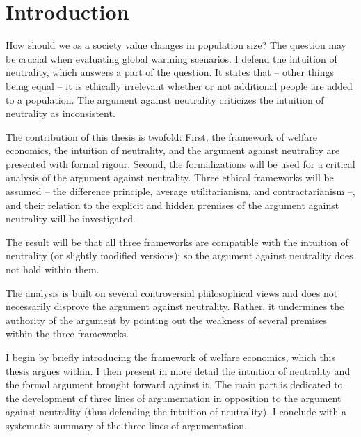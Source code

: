 \chapter*{Introduction}

How should we as a society value changes in population size? The question may be crucial when evaluating global warming scenarios. I defend the intuition of neutrality, which answers a part of the question. It states that – other things being equal – it is ethically irrelevant whether or not additional people are added to a population. The argument against neutrality criticizes the intuition of neutrality as inconsistent. 

The contribution of this thesis is twofold: First, the framework of welfare economics, the intuition of neutrality, and the argument against neutrality are presented with formal rigour. Second, the formalizations will be used for a critical analysis of the argument against neutrality. Three ethical frameworks will be assumed -- the difference principle, average utilitarianism, and contractarianism --, and their relation to the explicit and hidden premises of the argument against neutrality will be investigated. 

The result will be that all three frameworks are compatible with the intuition of neutrality (or slightly modified versions); so the argument against neutrality does not hold within them. 

The analysis is built on several controversial philosophical views and does not necessarily disprove the argument against neutrality. Rather, it undermines the authority of the argument by pointing out the weakness of several premises within the three frameworks.  

I begin by briefly introducing the framework of welfare economics, which this thesis argues within. I then present in more detail the intuition of neutrality and the formal argument brought forward against it. The main part is dedicated to the development of three lines of argumentation in opposition to the argument against neutrality (thus defending the intuition of neutrality). I conclude with a systematic summary of the three lines of argumentation. 
